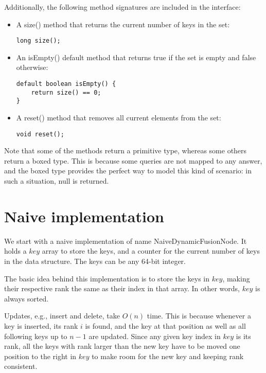 Additionally, the following method signatures are included in the interface:
\begin{itemize}
    \item
    A {\ttfamily size()} method that returns the current number of keys in the set:
    \begin{lstlisting}
long size();
    \end{lstlisting}

    \item
    An {\ttfamily isEmpty()} default method that returns {\ttfamily true} if the set is empty and {\ttfamily false} otherwise:
    \begin{lstlisting}
default boolean isEmpty() {
    return size() == 0;
}
    \end{lstlisting}

    \item
    A {\ttfamily reset()} method that removes all current elements from the set:
    \begin{lstlisting}
void reset();
    \end{lstlisting}
\end{itemize}

Note that some of the methods return a primitive type, whereas some others return a boxed type. This is because some queries are not mapped to any answer, and the boxed type provides the perfect way to model this kind of scenario: in such a situation, {\ttfamily null} is returned.

\section{Naive implementation}
We start with a naive implementation of name {\ttfamily NaiveDynamicFusionNode}. It holds a $key$ array to store the keys, and a counter for the current number of keys in the data structure. The keys can be any 64-bit integer.

The basic idea behind this implementation is to store the keys in $key$, making their respective rank the same as their index in that array. In other words, $key$ is always sorted.

Updates, e.g., insert and delete, take $O(n)$ time. This is because whenever a key is inserted, its rank $i$ is found, and the key at that position as well as all following keys up to $n-1$ are updated. Since any given key index in $key$ is its rank, all the keys with rank larger than the new key have to be moved one position to the right in $key$ to make room for the new key and keeping rank consistent.

